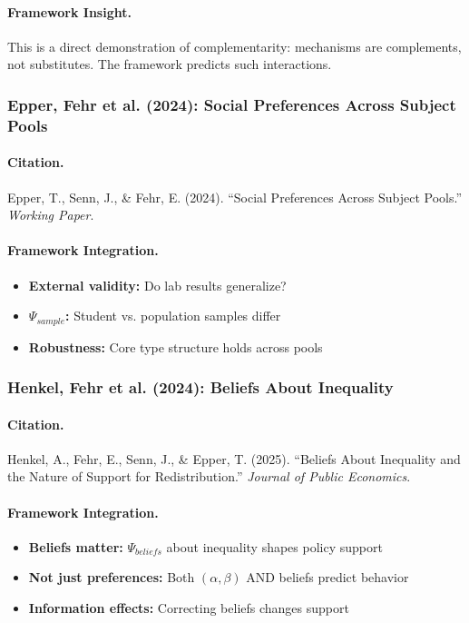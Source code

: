 \documentclass[12pt,a4paper]{article}
\begin{document}
\paragraph{Framework Insight.}
This is a direct demonstration of complementarity: mechanisms are
complements, not substitutes. The framework predicts such interactions.

\subsubsection{Epper, Fehr et al. (2024): Social Preferences Across Subject Pools}

\paragraph{Citation.}
Epper, T., Senn, J., \& Fehr, E. (2024). ``Social Preferences Across Subject Pools.''
\emph{Working Paper}.

\paragraph{Framework Integration.}
\begin{itemize}
  \item \textbf{External validity:} Do lab results generalize?
  \item \textbf{$\Psi_{sample}$:} Student vs. population samples differ
  \item \textbf{Robustness:} Core type structure holds across pools
\end{itemize}

\subsubsection{Henkel, Fehr et al. (2024): Beliefs About Inequality}

\paragraph{Citation.}
Henkel, A., Fehr, E., Senn, J., \& Epper, T. (2025).
``Beliefs About Inequality and the Nature of Support for Redistribution.''
\emph{Journal of Public Economics}.

\paragraph{Framework Integration.}
\begin{itemize}
  \item \textbf{Beliefs matter:} $\Psi_{beliefs}$ about inequality shapes policy support
  \item \textbf{Not just preferences:} Both $(\alpha, \beta)$ AND beliefs predict behavior
  \item \textbf{Information effects:} Correcting beliefs changes support
\end{itemize}
\end{document}
